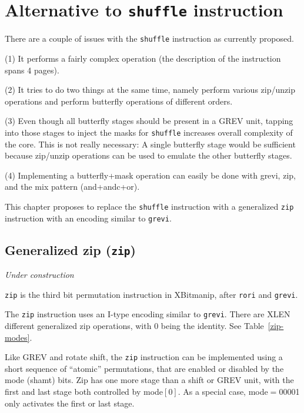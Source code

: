\chapter{Alternative to \texttt{shuffle} instruction}

There are a couple of issues with the {\tt shuffle} instruction as currently proposed.

(1) It performs a fairly complex operation (the description of the instruction
spans 4 pages).

(2) It tries to do two things at the same time, namely perform various zip/unzip
operations and perform butterfly operations of different orders.

(3) Even though all butterfly stages should be present in a GREV unit, tapping into
those stages to inject the masks for {\tt shuffle} increases overall complexity of
the core. This is not really necessary: A single butterfly stage would be sufficient
because zip/unzip operations can be used to emulate the other butterfly stages.

(4) Implementing a butterfly+mask operation can easily be done with grevi, zip,
and the mix pattern (and+andc+or).

This chapter proposes to replace the {\tt shuffle} instruction with a generalized
{\tt zip} instruction with an encoding similar to {\tt grevi}.


\section{Generalized zip (\texttt{zip})}

{\it Under construction}

{\tt zip} is the third bit permutation instruction in XBitmanip, after {\tt rori}
and {\tt grevi}.

The {\tt zip} instruction uses an I-type encoding similar to {\tt grevi}. There
are XLEN different generalized zip operations, with 0 being the identity. See
Table~\ref{zip-modes}.

Like GREV and rotate shift, the {\tt zip} instruction can be implemented using a short
sequence of ``atomic'' permutations, that are enabled or disabled by the mode (shamt)
bits. Zip has one more stage than a shift or GREV unit, with the first and last stage
both controlled by mode$[0]$. As a special case, mode$=$00001 only activates the
first or last stage.

